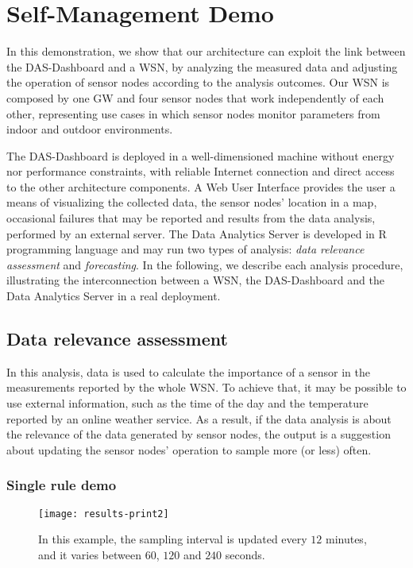\documentclass[conference, letterpaper]{IEEEtran}
\newcommand{\dashboard}[1]{DAS-Dashboard}
\newcommand{\gateway}[1]{GW#1}
\begin{document}
\section{Self-Management Demo}

In this demonstration, we show that our architecture can exploit the link between the \dashboard{} and a WSN, by analyzing the measured data and adjusting the operation of sensor nodes according to the analysis outcomes. Our WSN is composed by one \gateway{} and four sensor nodes that work independently of each other, representing use cases in which sensor nodes monitor parameters from indoor and outdoor environments.

The \dashboard{} is deployed in a well-dimensioned machine without energy nor performance constraints, with reliable Internet connection and direct access to the other architecture components. A Web User Interface provides the user a means of visualizing the collected data, the sensor nodes' location in a map, occasional failures that may be reported and results from the data analysis, performed by an external server. The Data Analytics Server is developed in R programming language and may run two types of analysis: \emph{data relevance assessment} and \emph{forecasting}. In the following, we describe each analysis procedure, illustrating the interconnection between a WSN, the \dashboard{} and the Data Analytics Server in a real deployment.

\subsection{Data relevance assessment}

In this analysis, data is used to calculate the importance of a sensor in the measurements reported by the whole WSN. To achieve that, it may be possible to use external information, such as the time of the day and the temperature reported by an online weather service. As a result, if the data analysis is about the relevance of the data generated by sensor nodes, the output is a suggestion about updating the sensor nodes' operation to sample more (or less) often.

\subsubsection{Single rule demo}

\begin{figure}[t]
	\centering
\texttt{[image: results-print2]}
	\caption{In this example, the sampling interval is updated every $12$ minutes, and it varies between $60$, $120$ and $240$ seconds.}
	\label{fig:adaptive-sampling}
\end{figure}
\end{document}
